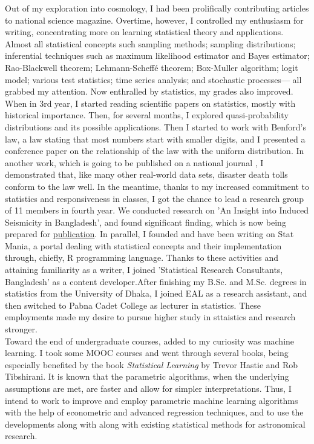 \documentclass{article}
\begin{document}
Out of my exploration into cosmology, I had been prolifically contributing articles to national science magazine. Overtime, however, I controlled my enthusiasm for writing, concentrating more on learning statistical theory and applications. Almost all statistical concepts such sampling methods; sampling distributions; inferential techniques such as maximum likelihood estimator and Bayes estimator; Rao-Blackwell theorem; Lehmann-Scheff\'e theorem; Box-Muller algorithm; logit model; various test statistics; time series analysis; and stochastic processes--- all grabbed my attention. Now enthralled by statistics, my grades also improved. When in 3rd year, I started reading scientific papers on statistics, mostly with historical importance. Then, for several months, I explored quasi-probability distributions and its possible applications. Then I started to work with Benford's law, a law stating that most numbers start with smaller digits, and I presented a conference paper on the relationship of the law with the uniform distribution. In another work, which is going to be published on a national journal , I demonstrated that, like many other real-world data sets, disaster death tolls conform to the law well. In the meantime, thanks to my increased commitment to statistics and responsiveness in classes, I got the chance to lead a research group of 11 members in fourth year. We conducted research on 'An Insight into Induced Seismicity in Bangladesh', and found significant finding, which is now being prepared for \href{https://drive.google.com/open?id=1PSrhBG65dMmJDyyjU44Kg5Ub5rmmIlyt}{publication}. 
In parallel, I founded and have been writing on Stat Mania, a portal dealing with statistical concepts and their implementation through, chiefly, R programming language. Thanks to these activities and attaining familiarity as a writer, I joined 'Statistical Research Consultants, Bangladesh' as a content developer.After finishing my B.Sc. and M.Sc. degrees in statistics from the University of Dhaka, I joined EAL as a research assistant, and then switched to Pabna Cadet College as lecturer in statistics. These employments made my desire to pursue higher study in sttaistics and research stronger. \\

Toward the end of undergraduate courses, added to my curiosity was machine learning. I took some MOOC courses and went through several books, being especially benefited by the book \textit{Statistical Learning} by Trevor Hastie and Rob Tibshirani. It is known that the parametric algorithms, when the underlying assumptions are met, are faster and allow for simpler interpretations. Thus, I intend to work to improve and employ parametric machine learning algorithms with the help of econometric and advanced regression techniques, and to use the developments along with along with existing statistical methods for astronomical research.  \\
\end{document}

